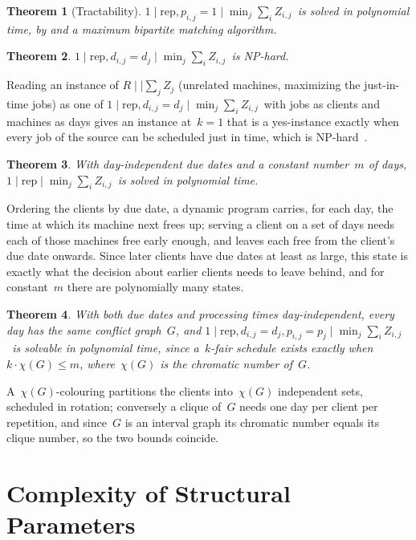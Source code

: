 \documentclass[11pt,a4paper]{article}
\newtheorem{theorem}{Theorem}
\theoremstyle{definition}
\newcommand{\threefield}[3]{$#1\mid#2\mid#3$}
\newcommand{\rep}{\mathrm{rep}}
\newcommand{\EQUIJIT}{\threefield{1}{\rep}{\min_j \sum_i Z_{i,j}}}
\newcommand{\OPEQUIJIT}{\threefield{1}{\rep, d_{i,j}=d_j}{\min_j \sum_i Z_{i,j}}}
\newcommand{\UEQUIJIT}{\threefield{1}{\rep, p_{i,j}=1}{\min_j \sum_i Z_{i,j}}}
\newcommand{\SDEQUIJIT}{\threefield{1}{\rep, d_{i,j}=d_j, p_{i,j}=p_j}{\min_j \sum_i Z_{i,j}}}
\begin{document}


\setcounter{theorem}{1}
\begin{theorem}[Tractability]
\label{thm:2trac}
\UEQUIJIT\ is solved in polynomial time, by  and a maximum bipartite matching
algorithm.
\end{theorem}

\setcounter{theorem}{10}
\begin{theorem}
\label{thm:11}
\OPEQUIJIT\ is NP-hard.
\end{theorem}
Reading an instance of \threefield{R}{}{\sum_j Z_j} (unrelated machines, maximizing the
just-in-time jobs) as one of \OPEQUIJIT\ with jobs as clients and machines as days gives an
instance at~$k=1$ that is a yes-instance exactly when every job of the source can be
scheduled just in time, which is NP-hard~\cite{Sung05}.

\setcounter{theorem}{11}
\begin{theorem}
\label{thm:12}
With day-independent due dates and a constant number~$m$ of days, \EQUIJIT\ is solved in
polynomial time.
\end{theorem}
Ordering the clients by due date, a dynamic program carries, for each day, the time at
which its machine next frees up; serving a client on a set of days needs each of those
machines free early enough, and leaves each free from the client's due date onwards. Since
later clients have due dates at least as large, this state is exactly what the decision
about earlier clients needs to leave behind, and for constant~$m$ there are polynomially
many states.

\setcounter{theorem}{12}
\begin{theorem}
\label{thm:13}
With both due dates and processing times day-independent, every day has the same conflict
graph~$G$, and \SDEQUIJIT\ is solvable in polynomial time, since a~$k$-fair schedule exists
exactly when~$k\cdot\chi(G)\le m$, where~$\chi(G)$ is the chromatic number of~$G$.
\end{theorem}
A~$\chi(G)$-colouring partitions the clients into~$\chi(G)$ independent sets, scheduled in
rotation; conversely a clique of~$G$ needs one day per client per repetition, and since~$G$
is an interval graph its chromatic number equals its clique number, so the two bounds
coincide.

\section{Complexity of Structural Parameters}
\label{sec:fpt}
\end{document}
